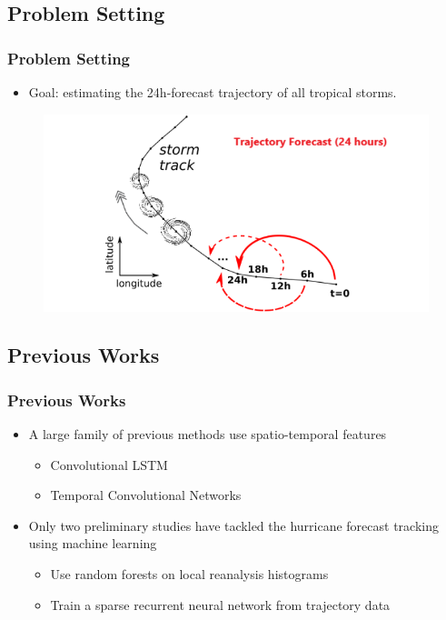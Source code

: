 \documentclass{beamer}
\begin{document}
\subsection{Problem Setting}
\begin{frame}
\frametitle{Problem Setting}
\begin{itemize}
	\item Goal: estimating the 24h-forecast trajectory of all tropical storms.  \\
\end{itemize}
\begin{figure}
	\includegraphics[width=0.8\linewidth]{figs/storm_shema.png}
\end{figure}
\end{frame}

\subsection{Previous Works}

\begin{frame}
\frametitle{Previous Works}
\begin{itemize}
\item A large family of previous methods use spatio-temporal features
\begin{itemize}
	\item Convolutional LSTM \cite{xingjian2015convolutional}
	\item Temporal Convolutional Networks \cite{bai2018empirical}
\end{itemize}
\item Only two preliminary studies have tackled the hurricane forecast tracking using machine learning
\begin{itemize}
	\item Use random forests on local reanalysis histograms \cite{liberge2011prevision}
	\item Train a sparse recurrent neural network from trajectory data \cite{moradi2016sparse}
\end{itemize}

\end{itemize}
\end{frame}
 
\end{document}
